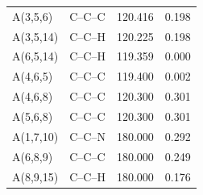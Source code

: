 \begin{longtable}{llrr}
A(3,5,6) & C--C--C & 120.416 & 0.198 \\
A(3,5,14) & C--C--H & 120.225 & 0.198 \\
A(6,5,14) & C--C--H & 119.359 & 0.000 \\
A(4,6,5) & C--C--C & 119.400 & 0.002 \\
A(4,6,8) & C--C--C & 120.300 & 0.301 \\
A(5,6,8) & C--C--C & 120.300 & 0.301 \\
A(1,7,10) & C--C--N & 180.000 & 0.292 \\
A(6,8,9) & C--C--C & 180.000 & 0.249 \\
A(8,9,15) & C--C--H & 180.000 & 0.176 \\
\bottomrule
\end{longtable}
